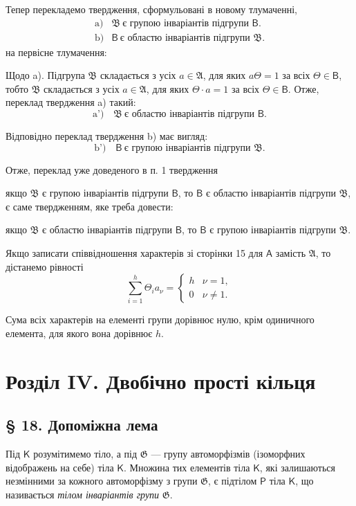 \documentclass[11pt]{article}
\begin{document}
Тепер перекладемо твердження, сформульовані в новому тлумаченні,
\[
\begin{array}{ll}
\text{a)}& \mathfrak B\ \text{є групою інваріантів підгрупи }\mathsf B.\\
\text{b)}& \mathsf B\ \text{є областю інваріантів підгрупи }\mathfrak B.
\end{array}
\]
на первісне тлумачення:

Щодо a). Підгрупа \(\mathfrak B\) складається з усіх \(a\in\mathfrak A\), для яких \(a\Theta=1\) за всіх \(\Theta\in\mathsf B\), тобто \(\mathfrak B\) складається з усіх \(a\in\mathfrak A\), для яких \(\Theta\cdot a=1\) за всіх \(\Theta\in\mathsf B\). Отже, переклад твердження a) такий:
\[
\text{a')} \quad \mathfrak B\ \text{є областю інваріантів підгрупи }\mathsf B.
\]

Відповідно переклад твердження b) має вигляд:
\[
\text{b')} \quad \mathsf B\ \text{є групою інваріантів підгрупи }\mathfrak B.
\]

Отже, переклад уже доведеного в п. 1 твердження

якщо \(\mathfrak B\) є групою інваріантів підгрупи \(\mathsf B\), то \(\mathsf B\) є областю інваріантів підгрупи \(\mathfrak B\),
є саме твердженням, яке треба довести:

якщо \(\mathfrak B\) є областю інваріантів підгрупи \(\mathsf B\), то \(\mathsf B\) є групою інваріантів підгрупи \(\mathfrak B\).

Якщо записати співвідношення характерів зі сторінки 15 для \(\mathsf A\) замість \(\mathfrak A\), то дістанемо рівності
\[
\sum_{i=1}^{h} \Theta_i a_\nu =
\begin{cases}
h & \nu=1,\\
0 & \nu\ne 1.
\end{cases}
\]

Сума всіх характерів на елементі групи дорівнює нулю, крім одиничного елемента, для якого вона дорівнює \(h\).

\section*{Розділ IV. Двобічно прості кільця}\label{kapitel-iv.-zweiseitig-einfache-ringe}

\subsection*{§ 18. Допоміжна лема}\label{ein-hilfssatz}

Під \(\mathsf K\) розумітимемо тіло, а під \(\mathfrak G\) --- групу автоморфізмів (ізоморфних відображень на себе) тіла \(\mathsf K\). Множина тих елементів тіла \(\mathsf K\), які залишаються незмінними за кожного автоморфізму з групи \(\mathfrak G\), є підтілом \(\mathsf P\) тіла \(\mathsf K\), що називається \emph{тілом інваріантів групи} \(\mathfrak G\).
\end{document}
